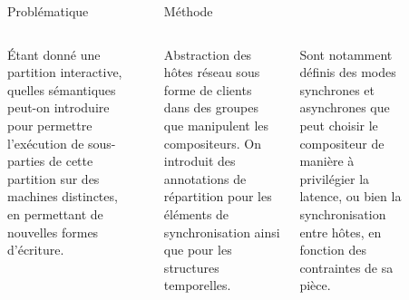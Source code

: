 \begin{columns}[t]
   \begin{column}{\sepwid}\end{column}
     \begin{column}{\onecolwid}
      \begin{block}{Problématique}
          \begin{columns}[t]
              \begin{column}{\onecolwid}\justify
                  Étant donné une partition interactive, quelles sémantiques peut-on introduire pour permettre l'exécution de sous-parties de cette partition sur des machines distinctes, en permettant de nouvelles formes d'écriture.
                \end{column}
            \end{columns}        
      \end{block}
     \end{column}
     \begin{column}{\sepwid}\end{column}
     \begin{column}{\twocolwid}
         \begin{block}{Méthode}             
             \begin{columns}[t]	                 
                 \begin{column}{\onecolwid}\justify
                     Abstraction des hôtes réseau sous forme de clients dans des groupes que manipulent les compositeurs. On introduit des annotations de répartition pour les éléments de synchronisation ainsi que pour les structures temporelles.
                     \end{column}
                     \begin{column}{\onecolwid}\justify
                     	Sont notamment définis des modes synchrones et asynchrones que peut choisir le compositeur de manière à privilégier la latence, ou bien la synchronisation entre hôtes, en fonction des contraintes de sa pièce.
                        \end{column}
                \end{columns}                 
            \end{block}
      \end{column}
      \begin{column}{\sepwid}\end{column}
      \begin{column}{\onecolwid}

\end{column}
\end{columns}
